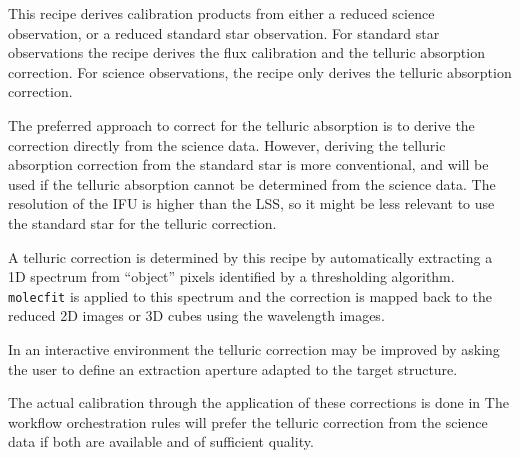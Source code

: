This recipe derives calibration products from either a reduced science
observation, or a reduced standard star observation.
For standard star observations the recipe derives the flux calibration and the
telluric absorption correction.
For science observations, the recipe only derives the telluric absorption
correction.

The preferred approach to correct for the telluric absorption is to derive the
correction directly from the science data.
However, deriving the telluric absorption correction from the standard star
is more conventional, and will be used if the telluric absorption cannot be
determined from the science data.
The resolution of the \ac{IFU} is higher than the \ac{LSS}, so it might be less
relevant to use the standard star for the telluric correction.

A telluric correction is determined by this recipe by automatically
extracting a 1D spectrum from ``object'' pixels identified by a
thresholding algorithm. \lstinline{molecfit} is applied to this
spectrum and the correction is mapped back to the reduced 2D images or
3D cubes using the wavelength images.

In an interactive environment the telluric correction may be improved by asking
the user to define an extraction aperture adapted to the target
structure.


The actual calibration through the application of these corrections is done in
The workflow orchestration rules will prefer the telluric correction from the
science data if both are available and of sufficient quality.

